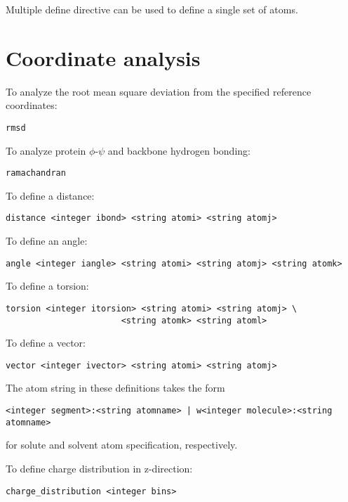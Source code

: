 Multiple define directive can be used to define a single set of atoms.

\section{Coordinate analysis}

To analyze the root mean square deviation from the specified reference
coordinates:

\begin{verbatim}
rmsd
\end{verbatim}

To analyze protein $\phi$-$\psi$ and backbone hydrogen bonding:

\begin{verbatim}
ramachandran
\end{verbatim}

To define a distance:

\begin{verbatim}
distance <integer ibond> <string atomi> <string atomj> 
\end{verbatim}

To define an angle:

\begin{verbatim}
angle <integer iangle> <string atomi> <string atomj> <string atomk> 
\end{verbatim}

To define a torsion:

\begin{verbatim}
torsion <integer itorsion> <string atomi> <string atomj> \
                       <string atomk> <string atoml> 
\end{verbatim}

To define a vector:

\begin{verbatim}
vector <integer ivector> <string atomi> <string atomj>
\end{verbatim}

The atom string in these definitions takes the form

\begin{verbatim}
<integer segment>:<string atomname> | w<integer molecule>:<string atomname>
\end{verbatim}

for solute and solvent atom specification, respectively.

To define charge distribution in z-direction:

\begin{verbatim}
charge_distribution <integer bins>
\end{verbatim}

